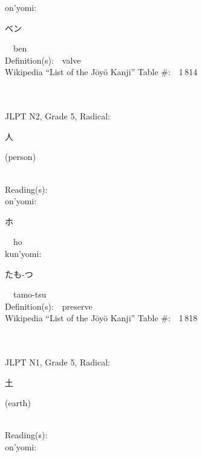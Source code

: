 \begin{multicols}{2}
{\hspace*{1em}}on'yomi:\ \ \\
{\hspace*{2em}}{\begin{CJK}{UTF8}{min} ベン \end{CJK}}\ \ ben\ \ \\
Definition(s):\ \ valve \\
Wikipedia ``List of the J\=oy\=o Kanji'' Table \#:\ \ 1\,814 \\
\ \ \\
{\fontsize{34pt}{40pt}  }\ \ \\  %
{JLPT N2, Grade 5, Radical:\ \ {\begin{CJK}{UTF8}{min} 人 \end{CJK}} (person) } \\
Reading(s):\ \ \\
{\hspace*{1em}}on'yomi:\ \ \\
{\hspace*{2em}}{\begin{CJK}{UTF8}{min} ホ \end{CJK}}\ \ ho\ \ \\
{\hspace*{1em}}kun'yomi:\ \ \\
{\hspace*{2em}}{\begin{CJK}{UTF8}{min} たも-つ \end{CJK}}\ \ tamo-tsu\ \ \\
Definition(s):\ \ preserve \\
Wikipedia ``List of the J\=oy\=o Kanji'' Table \#:\ \ 1\,818 \\
\ \ \\
{\fontsize{34pt}{40pt}  }\ \ \\  %
{JLPT N1, Grade 5, Radical:\ \ {\begin{CJK}{UTF8}{min} 土 \end{CJK}} (earth) } \\
Reading(s):\ \ \\
{\hspace*{1em}}on'yomi:\ \ \\

\end{multicols}
